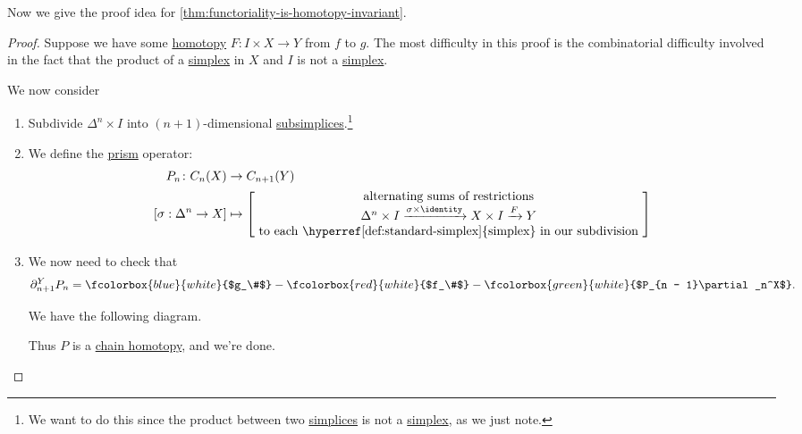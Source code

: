 Now we give the proof idea for \autoref{thm:functoriality-is-homotopy-invariant}.
\begin{proof}
	Suppose we have some \hyperref[def:homotopy]{homotopy} $F \colon I \times X \to Y$ from $f$ to $g$. The most difficulty in this proof is the
	combinatorial difficulty involved in the fact that the product of a \hyperref[def:standard-simplex]{simplex} in $X$ and $I$ is not a \hyperref[def:standard-simplex]{simplex}.

	We now consider
	\begin{enumerate}
		\item Subdivide $\Delta^n \times I$ into $(n + 1)$-dimensional \hyperref[def:subsimplex]{subsimplices}.\footnote{We want to do this since the product between two \hyperref[def:standard-simplex]{simplices} is not a \hyperref[def:standard-simplex]{simplex}, as we just note.}
		      \begin{figure}[H]
			      \centering
			      \label{fig:pf:functoriality-is-homotopy-invariant}
		      \end{figure}
		\item We define the \underline{prism} operator:
		      \begin{align*}
			      P_n \colon C_n(X)         & \to C_{n + 1}(Y)                                                                                              \\
			      [\sigma : \Delta^n \to X] & \mapsto \begin{bmatrix} \text{ alternating sums of restrictions }                                             \\
				                                          \Delta^n \times I \xrightarrow{\sigma \times \identity } X \times I \xrightarrow{F} Y \\
				                                          \text{ to each \hyperref[def:standard-simplex]{simplex} in our subdivision }
			                                          \end{bmatrix}
		      \end{align*}
		\item We now need to check that
		      \[
			      \partial_{n + 1}^YP_n = \fcolorbox{blue}{white}{$g_\#$} - \fcolorbox{red}{white}{$f_\#$} - \fcolorbox{green}{white}{$P_{n - 1}\partial_n^X$}.
		      \]

		      We have the following diagram.
		      \begin{figure}[H]
			      \centering
			      \label{fig:pf:functoriality-is-homotopy-invariant-2}
		      \end{figure}
		      Thus $P$ is a \hyperref[def:chain-homotopy]{chain homotopy}, and we're done.
	\end{enumerate}
\end{proof}